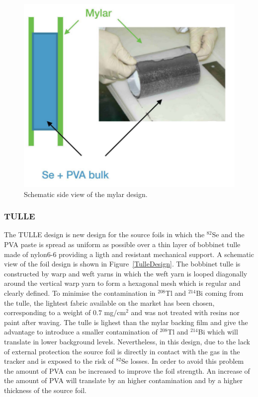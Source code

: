 \documentclass[main.tex]{subfiles}
\begin{document}
\begin{figure}[h!]
\centering
\includegraphics[scale=0.2]{pictures/Chap4/MylarDesign.png}
\caption{Schematic side view of the mylar design.}
\label{MylarDesign}
\end{figure}


\FloatBarrier


\subsubsection{TULLE}


\NI The TULLE design is new design for the source foils in which the $^{\text{82}}$Se and the PVA paste is spread as uniform as possible over a thin layer of bobbinet tulle made of nylon6-6 providing a ligth and resistant mechanical support. A schematic view of the foil design is shown in Figure~\ref{TulleDesign}. The bobbinet tulle is constructed by warp and weft yarns in which the weft yarn is looped diagonally around the vertical warp yarn to form a hexagonal mesh which is regular and clearly defined. To minimise the contamination in $^{\text{208}}$Tl and $^{\text{214}}$Bi coming from the tulle, the lightest fabric available on the market has been chosen, corresponding to a weight of 0.7 mg/cm$^\text{2}$ and was not treated with resins nor paint after waving. The tulle is lighest than the mylar backing film and give the advantage to introduce a smaller contamination of $^{\text{208}}$Tl and $^{\text{214}}$Bi which will translate in lower background levels. Nevertheless, in this design, due to the lack of external protection the source foil is directly in contact with the gas in the tracker and is exposed to the risk of $^{\text{82}}$Se losses. In order to avoid this problem the amount of PVA can be increased to improve the foil strength. An increase of the amount of PVA will translate by an higher contamination and by a higher thickness of the source foil. 
\end{document}
